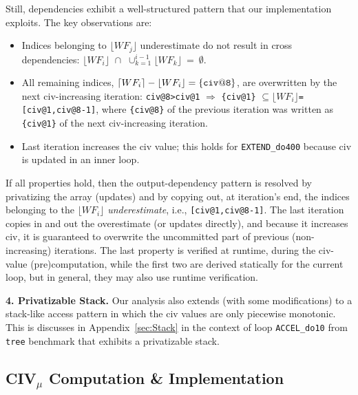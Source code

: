 \documentclass{sig-alternate}
\begin{document}
Still, dependencies exhibit a well-structured pattern that our 
implementation exploits. The key observations are: 
\begin{itemize}
    \item Indices belonging to $\lfloor{}WF_{j}\rfloor$ underestimate  
            do not result in cross dependencies:
        $\lfloor WF_{i}\rfloor\mbox{~}\cap\mbox{~}\cup_{k=1}^{i-1}\lfloor WF_{k}\rfloor~=~\emptyset$.

    \item All remaining indices, 
        $\lceil WF_{i}\rceil - \lfloor WF_{i}\rfloor = {\tt\{civ@8\}}$,
        are overwritten by the next {\sc civ}-increasing iteration:
        {\tt{}civ@8>civ@1} $\Rightarrow$
        {\tt\{civ@1\}} $\subseteq\lfloor WF_{i}\rfloor${\tt=[civ@1,civ@8-1]},
        where {\tt\{civ@8\}} of the previous iteration was written as 
        {\tt\{civ@1\}} of the next {\sc civ}-increasing iteration.

    \item Last iteration increases the {\sc civ} value; this 
        holds for {\tt EXTEND\_do400} because {\sc civ} is 
        updated in an inner loop.
\end{itemize}

If all properties hold, then the output-dependency pattern is resolved 
by privatizing the array (updates) and by copying out, at 
iteration's end, the indices belonging to the $\lfloor WF_i\rfloor$ 
{\em underestimate}, i.e., {\tt[civ@1,civ@8-1]}.
The last iteration copies in and out the overestimate (or updates directly),
and because it increases {\sc civ}, it is guaranteed to overwrite the 
uncommitted part of previous (non-increasing) iterations.
%
The last property is verified at runtime, during the {\sc civ}-value
(pre)computation, while the first two are derived statically 
for the current loop, but in general, they may also use runtime verification.

\vspace{1ex}
{\bf 4. Privatizable Stack.} Our analysis also extends (with
some modifications) to a stack-like access pattern in which
the {\sc civ} values are only piecewise monotonic.
This is discusses in Appendix~\ref{sec:Stack} in the
context of loop {\tt ACCEL\_do10} from {\tt tree} benchmark
that exhibits a privatizable stack. 


\subsection{CIV$_\mu$ Computation \& Implementation }
\label{subsect:CivImplem}
\end{document}
